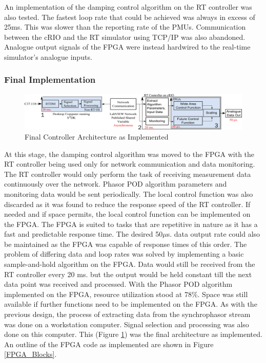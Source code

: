 \documentclass[conference]{IEEEtran}
\begin{document}
An implementation of the damping control algorithm on the RT controller was also tested. The fastest loop rate that could be achieved was always in excess of 25ms. This was slower than the reporting rate of the PMUs. Communication between the cRIO and the RT simulator using TCP/IP was also abandoned. Analogue output signals of the FPGA were instead hardwired to the real-time simulator's analogue inputs.

\subsubsection{Final Implementation}


\begin{figure}[!b]
\centering
\includegraphics[width=5in]{Final_RT_Arch.png} 
\caption{Final Controller Architecture as Implemented}
\label{Final_arch}
\end{figure}

At this stage, the damping control algorithm was moved to the FPGA with the RT controller being used only for network communication and data monitoring. The RT controller would only perform the task of receiving measurement data continuously over the network. Phasor POD algorithm parameters and monitoring data would be sent periodically. The local control function was also discarded as it was found to reduce the response speed of the RT controller. If needed and if space permits, the local control function can be implemented on the FPGA. The FPGA is suited to tasks that are repetitive in nature as it has a fast and predictable response time. The desired 50$\mu$s. data output rate could also be maintained as the FPGA was capable of response times of this order. The problem of differing data and loop rates was solved by implementing a basic sample-and-hold algorithm on the FPGA. Data would still be received from the RT controller every 20 ms. but the output would be held constant till the next data point was received and processed. With the Phasor POD algorithm implemented on the FPGA, resource utilization stood at 78\%. Space was still available if further functions need to be implemented on the FPGA. As with the previous design, the process of extracting data from the synchrophasor stream was done on a workstation computer. Signal selection and processing was also done on this computer. This (Figure \ref{Final_arch}) was the final architecture as implemented. An outline of the FPGA code as implemented are shown in Figure \ref{FPGA_Blocks}.
\end{document}
